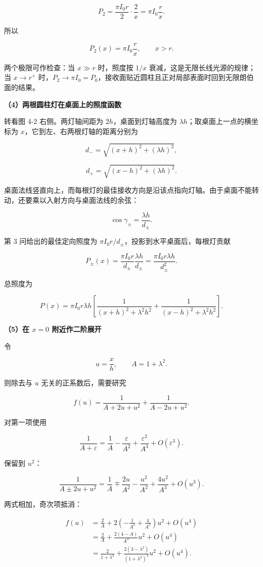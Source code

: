 \documentclass[12pt,a4paper,UTF8]{ctexart}
\begin{document}
\[
P_2=\frac{\pi I_0r}{2}\cdot\frac2x
=\pi I_0\frac rx.
\]

所以

\[
\boxed{P_2(x)=\pi I_0\frac rx},
\qquad x>r.
\]

两个极限可作检查：当 \(x\gg r\) 时，照度按 \(1/x\)
衰减，这是无限长线光源的规律；当 \(x\to r^+\)
时，\(P_2\to\pi I_0=P_0\)，接收面贴近圆柱且正对局部表面时回到无限朗伯面的结果。

\textbf{（4）两根圆柱灯在桌面上的照度函数}

转看图 4-2 右侧。两灯轴间距为 \(2h\)，桌面到灯轴高度为
\(\lambda h\)；取桌面上一点的横坐标为
\(x\)，它到左、右两根灯轴的距离分别为

\[
d_- =\sqrt{(x+h)^2+(\lambda h)^2},
\]

\[
d_+ =\sqrt{(x-h)^2+(\lambda h)^2}.
\]

桌面法线竖直向上，而每根灯的最佳接收方向是沿该点指向灯轴。由于桌面不能转动，还要乘以入射方向与桌面法线的余弦：

\[
\cos\gamma_\pm=\frac{\lambda h}{d_\pm}.
\]

第 3 问给出的最佳定向照度为
\(\pi I_0r/d_\pm\)，投影到水平桌面后，每根灯贡献

\[
P_\pm(x)=\frac{\pi I_0r}{d_\pm}
\frac{\lambda h}{d_\pm}
=\frac{\pi I_0r\lambda h}{d_\pm^2}.
\]

总照度为

\[
\boxed{
P(x)=\pi I_0r\lambda h
\left[
\frac1{(x+h)^2+\lambda^2h^2}
+\frac1{(x-h)^2+\lambda^2h^2}
\right]
}.
\]

\textbf{（5）在 \(x=0\) 附近作二阶展开}

令

\[u=\frac xh,
\qquad A=1+\lambda^2.\]

则除去与 \(u\) 无关的正系数后，需要研究

\[
f(u)=\frac1{A+2u+u^2}
+\frac1{A-2u+u^2}.
\]

对第一项使用

\[
\frac1{A+\varepsilon}
=\frac1A-\frac{\varepsilon}{A^2}
+\frac{\varepsilon^2}{A^3}+O(\varepsilon^3).
\]

保留到 \(u^2\)：

\[
\frac1{A\pm2u+u^2}
=\frac1A
\mp\frac{2u}{A^2}
-\frac{u^2}{A^2}
+\frac{4u^2}{A^3}
+O(u^3).
\]

两式相加，奇次项抵消：

\[
\begin{aligned}
f(u)
&=\frac2A
+2\left(-\frac1{A^2}+\frac4{A^3}\right)u^2
+O(u^4)\\
&=\frac2A
+\frac{2(4-A)}{A^3}u^2
+O(u^4)\\
&=\frac2{1+\lambda^2}
+\frac{2(3-\lambda^2)}{(1+\lambda^2)^3}u^2
+O(u^4).
\end{aligned}
\]
\end{document}
